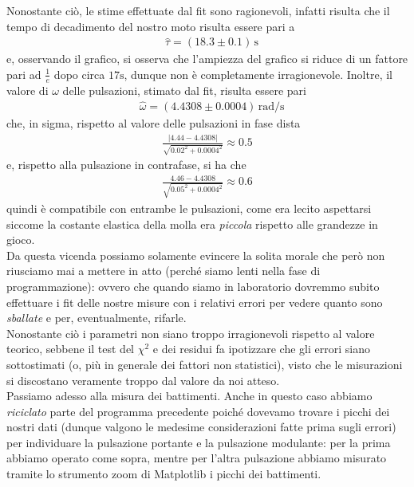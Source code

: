 \documentclass{article}
\begin{document}
Nonostante ciò, le stime effettuate dal fit sono ragionevoli, infatti risulta che il tempo di decadimento del nostro moto risulta essere pari a
\begin{align}
	&\hat{\tau} = (18.3 \pm 0.1) \, \si{\second}
\end{align}
e, osservando il grafico, si osserva che l'ampiezza del grafico si riduce di un fattore pari ad $\frac{1}{e}$ dopo circa $17 \si{\second}$, dunque non è completamente irragionevole. Inoltre, il valore di $\omega$ delle pulsazioni, stimato dal fit, risulta essere pari
\begin{align*}
	&\hat{\omega} = (4.4308 \pm 0.0004) \, \si{\radian\per\second}
\end{align*}
che, in sigma, rispetto al valore delle pulsazioni in fase dista
\begin{align*}
	\frac{|4.44 - 4.4308|}{\sqrt{0.02^2 + 0.0004^2}} \approx 0.5
\end{align*}
e, rispetto alla pulsazione in contrafase, si ha che
\begin{align*}
	\frac{4.46 - 4.4308}{\sqrt{0.05^2 + 0.0004^2}} \approx 0.6
\end{align*}
quindi è compatibile con entrambe le pulsazioni, come era lecito aspettarsi siccome la costante elastica della molla era \emph{piccola} rispetto alle grandezze in gioco. \\
Da questa vicenda possiamo solamente evincere la solita morale che però non riusciamo mai a mettere in atto (perché siamo lenti nella fase di programmazione): ovvero che quando siamo in laboratorio dovremmo subito effettuare i fit delle nostre misure con i relativi errori per vedere quanto sono \emph{sballate} e per, eventualmente, rifarle. \\
Nonostante ciò i parametri non siano troppo irragionevoli rispetto al valore teorico, sebbene il test del $\chi^2$ e dei residui fa ipotizzare che gli errori siano sottostimati (o, più in generale dei fattori non statistici), visto che le misurazioni si discostano veramente troppo dal valore da noi atteso. \\
Passiamo adesso alla misura dei battimenti. Anche in questo caso abbiamo \emph{riciclato} parte del programma precedente poiché dovevamo trovare i picchi dei nostri dati (dunque valgono le medesime considerazioni fatte prima sugli errori) per individuare la pulsazione portante e la pulsazione modulante: per la prima abbiamo operato come sopra, mentre per l'altra pulsazione abbiamo misurato tramite lo strumento zoom di Matplotlib i picchi dei battimenti.
\end{document}
